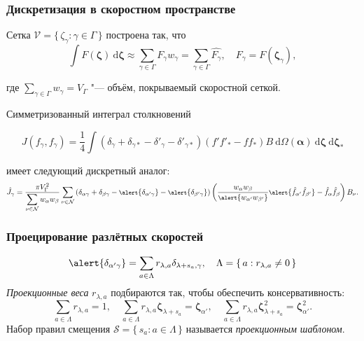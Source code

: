 \documentclass[mathserif]{beamer} %
\newcommand{\dd}{\:\mathrm{d}}
\newcommand{\dzeta}{\boldsymbol{\dd\zeta}}
\newcommand{\bzeta}{\boldsymbol{\zeta}}
\newcommand{\Nu}{\mathcal{N}}
\newcommand{\Set}[2]{\{\,{#1}:{#2}\,\}}
\begin{document}
\begin{frame}
    \frametitle{Дискретизация в скоростном пространстве}
    Сетка \(\mathcal{V} = \Set{\zeta_\gamma}{\gamma\in\Gamma}\) построена так, что
    \begin{equation}\label{eq:zeta_cubature}
        \int F(\bzeta) \dzeta \approx \sum_{\gamma\in\Gamma} F_\gamma w_\gamma =
            \sum_{\gamma\in\Gamma} \hat{F_\gamma},
            \quad F_\gamma = F(\bzeta_\gamma),
    \end{equation}\vspace{-10pt}

    где \(\sum_{\gamma\in\Gamma} w_\gamma = V_\Gamma\) "--- объём, покрываемый скоростной сеткой.
    \pause\vspace{20pt}

    Симметризованный интеграл столкновений\vspace{-20pt}

    \begin{equation}\label{eq:symm_ci}
        J(f_\gamma, f_\gamma) = \frac14\int \left(
            \delta_\gamma + \delta_{\gamma*} - \delta'_\gamma - \delta'_{\gamma*}
        \right) (f'f'_* - ff_*)B \dd\Omega(\boldsymbol{\alpha}) \dzeta\dzeta_*
    \end{equation}\vspace{-30pt}

    имеет следующий дискретный аналог:
    \begin{equation}\label{eq:discrete_symm_ci}
        \footnotesize
        \hat{J}_\gamma = \frac{\pi V_\Gamma^2}{\displaystyle\sum_{\nu\in\Nu} w_{\alpha}w_{\beta}}
            \sum_{\nu\in\Nu} \left(
                \delta_{\alpha\gamma} + \delta_{\beta\gamma} - \alert{\delta_{\alpha'\gamma}} - \alert{\delta_{\beta'\gamma}}
            \right)\left(
                \frac{w_{\alpha}w_{\beta}}{\alert{w_{\alpha'}w_{\beta'}}}
                \alert{\hat{f}_{\alpha'}\hat{f}_{\beta'}} - \hat{f}_{\alpha}\hat{f}_{\beta}
            \right)B_\nu.
    \end{equation}\vspace{-10pt}
\end{frame}

\begin{frame}
    \frametitle{Проецирование разлётных скоростей}
    \begin{equation}\label{eq:ci_projection}
        \alert{\delta_{\alpha'\gamma}} = \sum_{a\in\Lambda} r_{\lambda,a}\delta_{\lambda+s_a,\gamma}, \quad
        \Lambda = \Set{a}{r_{\lambda,a}\neq0}
    \end{equation}
    \emph{Проекционные веса} \(r_{\lambda,a}\) подбираются так, чтобы обеспечить консервативность:
    \begin{equation}\label{eq:stencil_conservation}
        \sum_{a\in\Lambda} r_{\lambda,a} = 1, \quad
        \sum_{a\in\Lambda} r_{\lambda,a} \bzeta_{\lambda+s_a} = \bzeta_{\alpha'}, \quad
        \sum_{a\in\Lambda} r_{\lambda,a} \bzeta_{\lambda+s_a}^2 = \bzeta_{\alpha'}^2.
    \end{equation}
    Набор правил смещения \(\mathcal{S} = \Set{s_a}{a\in\Lambda}\)
    называется \emph{проекционным шаблоном}.
\end{frame}
\end{document}
